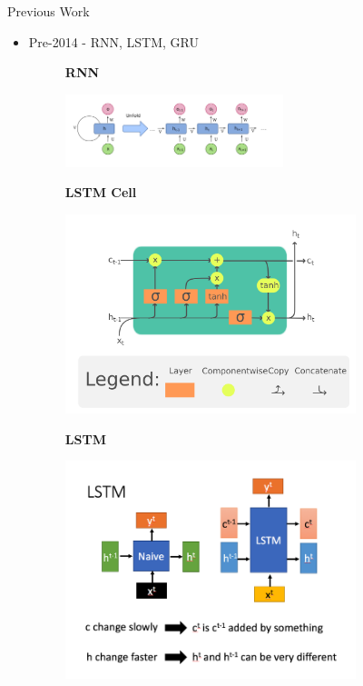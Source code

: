 \documentclass[
  notheorems,
  aspectratio=54,
]{beamer}
\begin{document}
\begin{frame}{Previous Work}
  \begin{itemize}
    \item Pre-2014 - RNN, LSTM, GRU
    \begin{figure}
      \centering
      \textbf{RNN}\par\medskip
      \includegraphics[width=0.6\textwidth]{rnn.png}
    \end{figure}
    \begin{figure}
      \begin{minipage}[b]{0.45\textwidth}
        \textbf{LSTM Cell}\par\medskip
          \includegraphics[width=0.8\textwidth]{lstm_cell.png}
      \end{minipage}
      \hfill
      \begin{minipage}[b]{0.45\textwidth}
        \textbf{LSTM}\par\medskip
          \includegraphics[width=0.8\textwidth]{lstm.jpg}
      \end{minipage}
    \end{figure}
  \end{itemize}
\end{frame}
\end{document}
